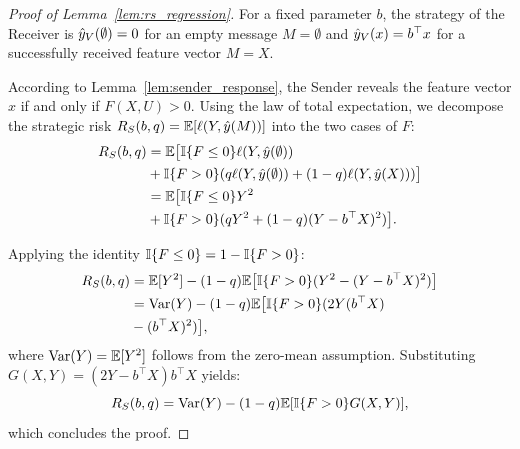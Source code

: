 \begin{proof}[Proof of Lemma~\ref{lem:rs_regression}]
For a fixed parameter $b$, the strategy of the Receiver is $\hat{y}_V(\emptyset)=0$ for an empty message $M=\emptyset$ and $\hat{y}_V(x)=b^\top x$ for a successfully received feature vector $M=X$. 

According to Lemma~\ref{lem:sender_response}, the Sender reveals the feature vector $x$ if and only if $F(X,U) > 0$. 
Using the law of total expectation, we decompose the strategic risk $R_S(b, q) = \mathbb{E}[\ell(Y, \hat{y}(M))]$ into the two cases of $F$:
\begin{align*}
  R_S(b, q) &= \mathbb{E}\big[ \mathbb{I}\{F \le 0\} \ell(Y, \hat{y}(\emptyset)) \\
  & + \mathbb{I}\{F > 0\} ( q \ell(Y, \hat{y}(\emptyset)) + (1-q) \ell(Y, \hat{y}(X)) ) \big] \\
  &= \mathbb{E}\big[ \mathbb{I}\{F \le 0\} Y^2\\
  &+ \mathbb{I}\{F > 0\} ( q Y^2 + (1-q) (Y - b^\top X)^2 ) \big].
\end{align*}

Applying the identity $\mathbb{I}\{F \le 0\} = 1 - \mathbb{I}\{F > 0\}$:
\begin{align*}
  R_S(b, q) &= \mathbb{E} [ Y^2 ] - (1-q) \mathbb{E} \big[ \mathbb{I}\{F > 0\} ( Y^2 - (Y - b^\top X)^2 ) \big] \\
  &= \operatorname{Var}(Y) - (1-q) \mathbb{E} \big[ \mathbb{I}\{F > 0\} ( 2Y (b^\top X) \\
  &- (b^\top X)^2 ) \big],
\end{align*}
where $\operatorname{Var}(Y) = \mathbb{E}[Y^2]$ follows from the zero-mean assumption. 
Substituting $G(X,Y) = (2Y - b^\top X) b^\top X$ yields:
\begin{equation*}
  R_S(b, q) = \operatorname{Var}(Y) - (1-q) \mathbb{E} [ \mathbb{I}\{F > 0\} G(X,Y) ],
\end{equation*}
which concludes the proof.
\end{proof}


